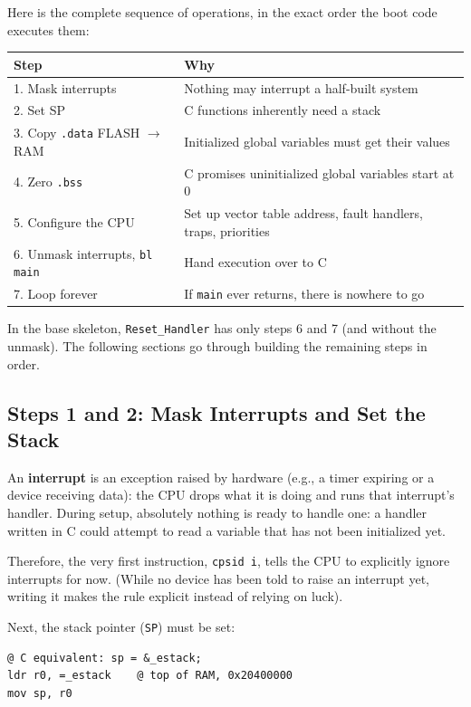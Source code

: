 Here is the complete sequence of operations, in the exact order the boot code executes them:
\begin{table}[h!]
    \centering
    \begin{tabular}{|l|l|}
        \hline
        \textbf{Step} & \textbf{Why} \\ \hline
        1. Mask interrupts & Nothing may interrupt a half-built system \\ \hline
        2. Set SP & C functions inherently need a stack \\ \hline
        3. Copy \texttt{.data} FLASH $\rightarrow$ RAM & Initialized global variables must get their values \\ \hline
        4. Zero \texttt{.bss} & C promises uninitialized global variables start at 0 \\ \hline
        5. Configure the CPU & Set up vector table address, fault handlers, traps, priorities \\ \hline
        6. Unmask interrupts, \texttt{bl main} & Hand execution over to C \\ \hline
        7. Loop forever & If \texttt{main} ever returns, there is nowhere to go \\ \hline
    \end{tabular}
\end{table}

In the base skeleton, \texttt{Reset\_Handler} has only steps 6 and 7 (and without the unmask). The following sections go through building the remaining steps in order.

\subsection{Steps 1 and 2: Mask Interrupts and Set the Stack}
An \textbf{interrupt} is an exception raised by hardware (e.g., a timer expiring or a device receiving data): the CPU drops what it is doing and runs that interrupt's handler. During setup, absolutely nothing is ready to handle one: a handler written in C could attempt to read a variable that has not been initialized yet.

Therefore, the very first instruction, \texttt{cpsid i}, tells the CPU to explicitly ignore interrupts for now. (While no device has been told to raise an interrupt yet, writing it makes the rule explicit instead of relying on luck).

Next, the stack pointer (\texttt{SP}) must be set:
\begin{lstlisting}
@ C equivalent: sp = &_estack;
ldr r0, =_estack    @ top of RAM, 0x20400000
mov sp, r0
\end{lstlisting}

